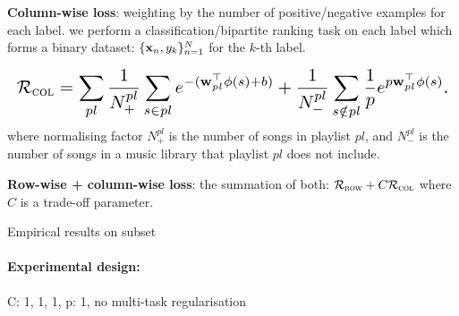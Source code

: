 {\bf Column-wise loss}: weighting by the number of positive/negative examples for each label.
\ie we perform a classification/bipartite ranking task on each label which forms a binary dataset:
$\{\mathbf{x}_n, y_k\}_{n=1}^N$ for the $k$-th label.

\begin{equation*}
\resizebox{\linewidth}{!}{$
\RCal_\textsc{col} 
= \displaystyle \sum_{pl}
  \frac{1}{N_+^{pl}} \sum_{s \in pl} e^{-(\w_{pl}^\top \phi(s) + b)} +
  \frac{1}{N_-^{pl}} \sum_{s \notin pl} \frac{1}{p} e^{p \w_{pl}^\top \phi(s)}.
$}
\end{equation*}
where normalising factor $N_+^{pl}$ is the number of songs in playlist $pl$,
and $N_-^{pl}$ is the number of songs in a music library that playlist $pl$ does not include.


{\bf Row-wise + column-wise loss}: the summation of both: $\mathcal{R}_\textsc{row} + C \mathcal{R}_\textsc{col}$ 
where $C$ is a trade-off parameter.



Empirical results on subset \\

\paragraph{Experimental design:}
C: 1, 1, 1, p: 1, no multi-task regularisation


